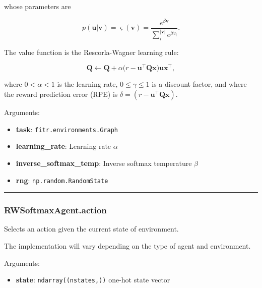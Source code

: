 whose parameters are

\[
p(\mathbf u|\mathbf v) = \varsigma(\mathbf v) = \frac{e^{\beta \mathbf v}}{\sum_{i}^{|\mathbf v|} e^{\beta v_i}}.
\]

The value function is the Rescorla-Wagner learning rule:

\[
\mathbf Q \gets \mathbf Q + \alpha \big(r - \mathbf u^\top \mathbf Q \mathbf x \big) \mathbf u \mathbf x^\top,
\]

where \(0 < \alpha < 1\) is the learning rate, \(0 \leq \gamma \leq 1\)
is a discount factor, and where the reward prediction error (RPE) is
\(\delta = (r - \mathbf u^\top \mathbf Q \mathbf x)\).

Arguments:

\begin{itemize}
\tightlist
\item
  \textbf{task}: \texttt{fitr.environments.Graph}
\item
  \textbf{learning\_rate}: Learning rate \(\alpha\)
\item
  \textbf{inverse\_softmax\_temp}: Inverse softmax temperature \(\beta\)
\item
  \textbf{rng}: \texttt{np.random.RandomState}
\end{itemize}

\begin{center}\rule{0.5\linewidth}{\linethickness}\end{center}

\subsubsection{RWSoftmaxAgent.action}\label{rwsoftmaxagent.action}

\begin{Shaded}
\begin{Highlighting}[]
\end{Highlighting}
\end{Shaded}

Selects an action given the current state of environment.

The implementation will vary depending on the type of agent and
environment.

Arguments:

\begin{itemize}
\tightlist
\item
  \textbf{state}: \texttt{ndarray((nstates,))} one-hot state vector
\end{itemize}


